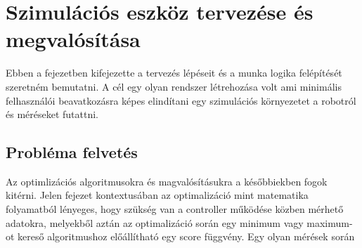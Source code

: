 \chapter{Szimulációs eszköz tervezése és megvalósítása}
Ebben a fejezetben kifejezette a tervezés lépéseit és a munka logika felépítését szeretném bemutatni. A cél egy olyan rendszer létrehozása volt ami minimális felhasználói beavatkozásra képes elindítani egy szimulációs környezetet a robotról és méréseket futattni.

\section{Probléma felvetés}
Az optimlizációs algoritmusokra és magvalósításukra a későbbiekben fogok kitérni. Jelen fejezet kontextusában az optimalizáció mint matematika folyamatból lényeges, hogy szükség van a controller működése közben mérhető adatokra, melyekből aztán az optimalizáció során egy minimum vagy maximum-ot kereső algoritmushoz előállítható egy score függvény. Egy olyan mérések során